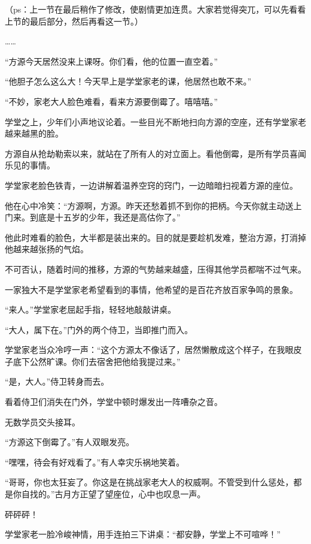 
\begin{this_body}

（ps：上一节在最后稍作了修改，使剧情更加连贯。大家若觉得突兀，可以先看看上节的最后部分，然后再看这一节。）

……

“方源今天居然没来上课呀。你们看，他的位置一直空着。”

“他胆子怎么这么大！今天早上是学堂家老的课，他居然也敢不来。”

“不妙，家老大人脸色难看，看来方源要倒霉了。嘻嘻嘻。”

学堂之上，少年们小声地议论着。一些目光不断地扫向方源的空座，还有学堂家老越来越黑的脸。

方源自从抢劫勒索以来，就站在了所有人的对立面上。看他倒霉，是所有学员喜闻乐见的事情。

学堂家老脸色铁青，一边讲解着温养空窍的窍门，一边暗暗扫视着方源的座位。

他在心中冷笑：“方源啊，方源。昨天还愁着抓不到你的把柄。今天你就主动送上门来。到底是十五岁的少年，我还是高估你了。”

他此时难看的脸色，大半都是装出来的。目的就是要趁机发难，整治方源，打消掉他越来越张扬的气焰。

不可否认，随着时间的推移，方源的气势越来越盛，压得其他学员都喘不过气来。

一家独大不是学堂家老希望看到的事情，他希望的是百花齐放百家争鸣的景象。

“来人。”学堂家老屈起手指，轻轻地敲敲讲桌。

“大人，属下在。”门外的两个侍卫，当即推门而入。

学堂家老当众冷哼一声：“这个方源太不像话了，居然懒散成这个样子，在我眼皮子底下公然旷课。你们去宿舍把他给我提过来。”

“是，大人。”侍卫转身而去。

看着侍卫们消失在门外，学堂中顿时爆发出一阵嘈杂之音。

无数学员交头接耳。

“方源这下倒霉了。”有人双眼发亮。

“嘿嘿，待会有好戏看了。”有人幸灾乐祸地笑着。

“哥哥，你也太狂妄了。你这是在挑战家老大人的权威啊。不管受到什么惩处，都是你自找的。”古月方正望了望座位，心中也叹息一声。

砰砰砰！

学堂家老一脸冷峻神情，用手连拍三下讲桌：“都安静，学堂上不可喧哗！”


\end{this_body}
